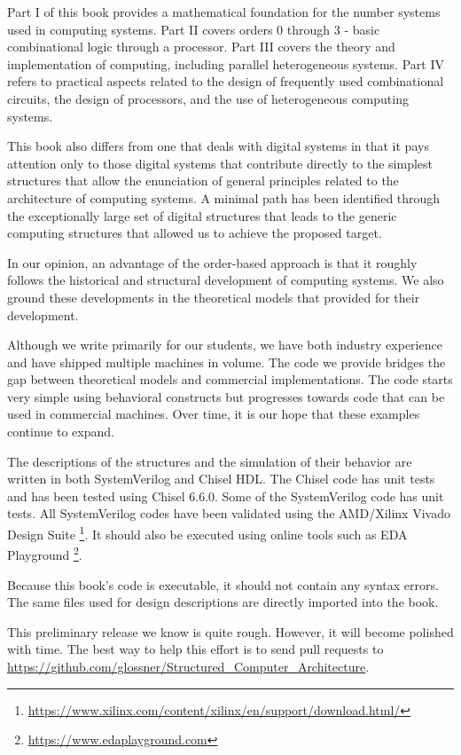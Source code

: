 \documentclass[11pt]{book}
\begin{document}
Part I of this book provides a mathematical foundation for the number systems used in computing systems. Part II covers orders 0 through 3 - basic combinational logic through a processor. Part III covers the theory and implementation of computing, including parallel heterogeneous systems. Part IV refers to practical aspects related to the design of frequently used combinational circuits, the design of processors, and the use of heterogeneous computing systems. 

This book also differs from one that deals with digital systems in that it pays attention only to those digital systems that contribute directly to the simplest structures that allow the enunciation of general principles related to the architecture of computing systems. A minimal path has been identified through the exceptionally large set of digital structures that leads to the generic computing structures that allowed us to achieve the proposed target.

In our opinion, an advantage of the order-based approach is that it roughly follows the historical and structural development of computing systems. We also ground these developments in the theoretical models that provided for their development.

Although we write primarily for our students, we have both industry experience and have shipped multiple machines in volume. The code we provide bridges the gap between theoretical models and commercial implementations. The code starts very simple using behavioral constructs but progresses towards code that can be used in commercial machines. Over time, it is our hope that these examples continue to expand.

The descriptions of the structures and the simulation of their behavior are written in both SystemVerilog and Chisel HDL. The Chisel code has unit tests and has been tested using Chisel 6.6.0. Some of the SystemVerilog code has unit tests. All SystemVerilog codes have been validated using the AMD/Xilinx Vivado Design Suite \footnote{\url{https://www.xilinx.com/content/xilinx/en/support/download.html/}}. It should also be executed using online tools such as EDA Playground \footnote{\url{https://www.edaplayground.com}}.

Because this book's code is executable, it should not contain any syntax errors. The same files used for design descriptions are directly imported into the book.

This preliminary release we know is quite rough. However, it will become polished with time. The best way to help this effort is to send pull requests to \url{https://github.com/glossner/Structured_Computer_Architecture}. 
\end{document}
